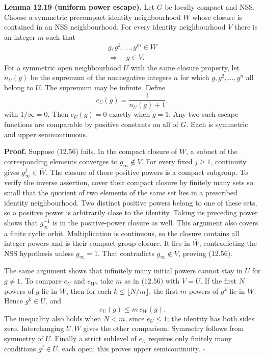 \documentclass[
  11pt,
]{article}
\begin{document}
\textbf{Lemma 12.19 (uniform power escape).} Let \(G\) be locally
compact and NSS. Choose a symmetric precompact identity neighbourhood
\(W\) whose closure is contained in an NSS neighbourhood. For every
identity neighbourhood \(V\) there is an integer \(m\) such that \[
\begin{gathered}
g,g^2,\ldots,g^m\in W\\
\Longrightarrow\quad g\in V.
\end{gathered}
\tag{12.56}
\] For a symmetric open neighbourhood \(U\) with the same closure
property, let \(n_U(g)\) be the supremum of the nonnegative integers
\(n\) for which \(g,g^2,\ldots,g^n\) all belong to \(U\). The supremum
may be infinite. Define \[
e_U(g)=\frac1{n_U(g)+1},
\tag{12.57}
\] with \(1/\infty=0\). Then \(e_U(g)=0\) exactly when \(g=1\). Any two
such escape functions are comparable by positive constants on all of
\(G\). Each is symmetric and upper semicontinuous.

\textbf{Proof.} Suppose (12.56) fails. In the compact closure of \(W\),
a subnet of the corresponding elements converges to
\(g_\infty\notin V\). For every fixed \(j\geq1\), continuity gives
\(g_\infty^j\in\overline W\). The closure of these positive powers is a
compact subgroup. To verify the inverse assertion, cover their compact
closure by finitely many sets so small that the quotient of two elements
of the same set lies in a prescribed identity neighbourhood. Two
distinct positive powers belong to one of these sets, so a positive
power is arbitrarily close to the identity. Taking its preceding power
shows that \(g_\infty^{-1}\) is in the positive-power closure as well.
This argument also covers a finite cyclic orbit. Multiplication is
continuous, so the closure contains all integer powers and is their
compact group closure. It lies in \(\overline W\), contradicting the NSS
hypothesis unless \(g_\infty=1\). That contradicts \(g_\infty\notin V\),
proving (12.56).

The same argument shows that infinitely many initial powers cannot stay
in \(U\) for \(g\ne1\). To compare \(e_U\) and \(e_W\), take \(m\) as in
(12.56) with \(V=U\). If the first \(N\) powers of \(g\) lie in \(W\),
then for each \(k\leq\lfloor N/m\rfloor\), the first \(m\) powers of
\(g^k\) lie in \(W\). Hence \(g^k\in U\), and \[
e_U(g)\leq m\,e_W(g).
\tag{12.58}
\] The inequality also holds when \(N<m\), since \(e_U\leq1\); the
identity has both sides zero. Interchanging \(U,W\) gives the other
comparison. Symmetry follows from symmetry of \(U\). Finally a strict
sublevel of \(e_U\) requires only finitely many conditions \(g^j\in U\),
each open; this proves upper semicontinuity. \(\square\)
\end{document}
